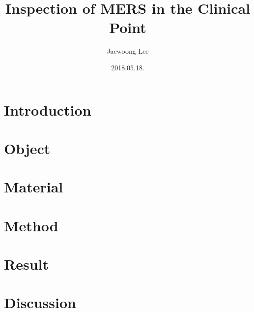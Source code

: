 \documentclass[aps,10pt,a4paper]{article}
\title{Inspection of MERS in the Clinical Point}
\author{Jaewoong Lee}
\date{2018.05.18.}
\begin{document}
	\maketitle
	\newpage
	
	\tableofcontents
	\listoftables
	\listoffigures
	\newpage
	
	\section{Introduction}
		
	
	\section{Object}
	
	\section{Material}
	
	\section{Method}
	
	\section{Result}
	
	\section{Discussion}
	
	
	
\end{document}
